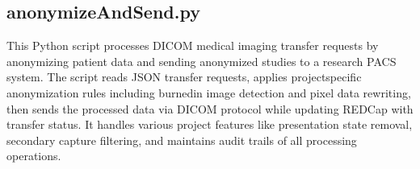 \documentclass[letterpaper,10pt,english]{sphinxmanual}
\begin{document}
\subsection{anonymizeAndSend.py}
\label{\detokenize{Architecture/scripts/anonymizeAndSend:anonymizeandsend-py}}\label{\detokenize{Architecture/scripts/anonymizeAndSend::doc}}
\sphinxAtStartPar
This Python script processes DICOM medical imaging transfer requests by anonymizing patient data and sending anonymized studies to a research PACS system. The script reads JSON transfer requests, applies project\sphinxhyphen{}specific anonymization rules including burned\sphinxhyphen{}in image detection and pixel data rewriting, then sends the processed data via DICOM protocol while updating REDCap with transfer status. It handles various project features like presentation state removal, secondary capture filtering, and maintains audit trails of all processing operations.

\sphinxAtStartPar
{}


\sphinxAtStartPar
{}

\end{document}
